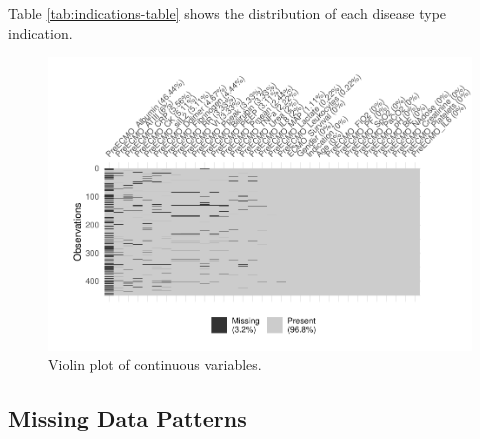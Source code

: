 \documentclass[12pt,]{article}
\begin{document}
Table \ref{tab:indications-table} shows the distribution of each disease
type indication.

\begin{figure}[H]

{\centering \includegraphics[width=1\linewidth]{figure/graphics-unnamed-chunk-4-1} 

}

\caption{\label{fig:violin-standardized}Violin plot of continuous variables.}\label{fig:unnamed-chunk-4}
\end{figure}

\subsection{Missing Data Patterns}\label{missing-data-patterns}
\end{document}
